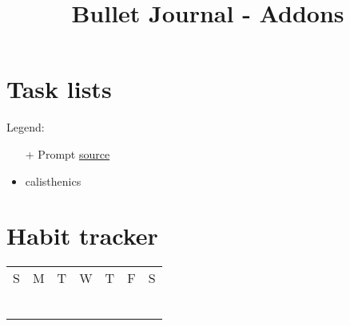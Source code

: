 \documentclass[a5paper]{article}
\title{Bullet Journal - Addons}
\begin{document}
\maketitle
\tableofcontents
\newpage
\section{Task lists}
Legend:
\begin{itemize}
	\item [+] Prompt \href{https://bulletjournal.com/blogs/bulletjournalist/long-form-journaling}{source}
\end{itemize}
\begin{itemize}
	\item calisthenics
\end{itemize}
\section{Habit tracker}
\begin{table}[htp]
\begin{tabular}{lllllll}
\cline{1-1}
S                      & M & T & W & T & F & S \\ \cline{1-1}
                       &   &   &   &   &   &   \\
                       &   &   &   &   &   &   \\
                       &   &   &   &   &   &   \\
                       &   &   &   &   &   &   \\ \cline{1-1}
\multicolumn{1}{|l|}{} &   &   &   &   &   &   \\ \cline{1-1}
                       &   &   &   &   &   &   \\ \cline{1-1}
\end{tabular}
\end{table}
\end{document}
